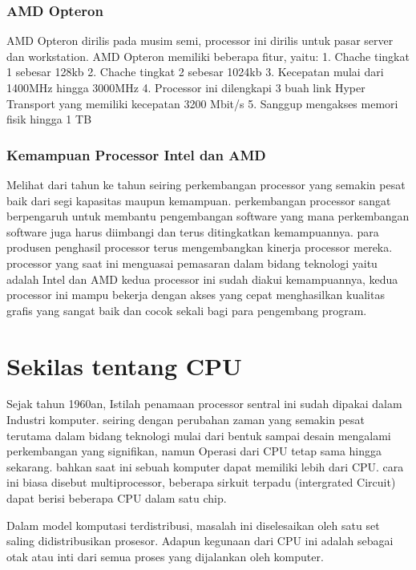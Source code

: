  			\subsubsection{AMD Opteron}
	AMD Opteron dirilis pada musim semi, processor ini dirilis untuk pasar server dan workstation. AMD Opteron memiliki beberapa fitur, yaitu:
		1. Chache tingkat 1 sebesar 128kb
		2. Chache tingkat 2 sebesar 1024kb
		3. Kecepatan mulai dari 1400MHz hingga 3000MHz
		4. Processor ini dilengkapi 3 buah link Hyper Transport yang memiliki kecepatan 3200 Mbit/s
		5. Sanggup mengakses memori fisik hingga 1 TB 


			

			\subsubsection{Kemampuan Processor Intel dan AMD}
 	Melihat dari tahun ke tahun seiring perkembangan processor yang semakin pesat baik dari segi kapasitas maupun kemampuan. perkembangan processor sangat berpengaruh untuk membantu pengembangan software yang mana perkembangan software juga harus diimbangi dan terus ditingkatkan kemampuannya. para produsen penghasil processor terus mengembangkan kinerja processor mereka. processor yang saat ini menguasai pemasaran dalam bidang teknologi yaitu adalah Intel dan AMD kedua processor ini sudah diakui kemampuannya, kedua processor ini mampu bekerja dengan akses yang cepat menghasilkan kualitas grafis yang sangat baik dan cocok sekali bagi para pengembang program.\cite{irwansyah2014pengantar} 




 	\section{Sekilas tentang CPU}
 	Sejak tahun 1960an, Istilah penamaan processor sentral ini sudah dipakai dalam Industri komputer. seiring dengan perubahan zaman yang semakin pesat terutama dalam bidang teknologi mulai dari bentuk sampai desain mengalami perkembangan yang signifikan, namun Operasi dari CPU tetap sama hingga sekarang. bahkan saat ini sebuah komputer dapat memiliki lebih dari CPU. cara ini biasa disebut multiprocessor, beberapa sirkuit terpadu (intergrated Circuit) dapat berisi beberapa CPU dalam satu chip.
 
 	Dalam model komputasi terdistribusi, masalah ini diselesaikan oleh satu set saling didistribusikan prosesor. Adapun kegunaan dari CPU ini adalah sebagai otak atau inti dari semua proses yang dijalankan oleh komputer.



